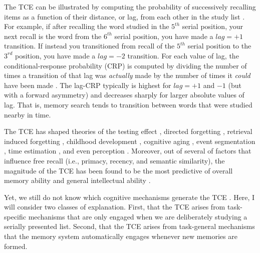 \documentclass[man,natbib,floatsintext]{apa6} %
\begin{document}
The TCE can be illustrated by computing the probability of successively recalling items as a function of their distance, or lag, from each other in the study list \citep{Kaha96}. For example, if after recalling the word studied in the $5^{th}$ serial position, your next recall is the word from the $6^{th}$ serial position, you have made a $lag=+1$ transition. If instead you transitioned from recall of the $5^{th}$ serial position to the $3^{rd}$ position, you have made a $lag=-2$ transition. For each value of lag, the conditional-response probability (CRP) is computed by dividing the number of times a transition of that lag was \emph{actually} made by the number of times it \emph{could} have been made \citep[e.g., if you have just recalled the last item in the list, it is not possible to make a $lag=+1$ transition. Transitions to already recalled items are also excluded from the counts as subjects rarely repeat items;][]{Kaha96}. The lag-CRP typically is highest for $lag=+1$ and $-1$ (but with a forward asymmetry) and decreases sharply for larger absolute values of lag. That is, memory search tends to transition between words that were studied nearby in time.

The TCE has shaped theories of the testing effect \citep{KarpEtal14}, directed forgetting \citep{SahaEtal13}, retrieval induced forgetting \citep{KlieBaum16}, childhood development \citep{JarroEtal15}, cognitive aging \citep{WahlHuff15,HealKaha15}, event segmentation \citep{EzzyDava14}, time estimation \citep{SahaSmit13}, and even perception \citep{TurkEtal12}. Moreover, out of several of factors that influence free recall (i.e., primacy, recency, and semantic similarity), the magnitude of the TCE has been found to be the most predictive of overall memory ability \citep{SedeEtal10,SpilUnsw11} and general intellectual ability \citep{HealEtal14}.

Yet, we still do not know which cognitive mechanisms generate the TCE \citep{HealKaha17}. Here, I will consider two classes of explanation. First, that the TCE arises from task-specific mechanisms that are only engaged when we are deliberately studying a serially presented list. Second, that the TCE arises from task-general mechanisms that the memory system automatically engages whenever new memories are formed.%



\label{TODO-2}   
\end{document}
